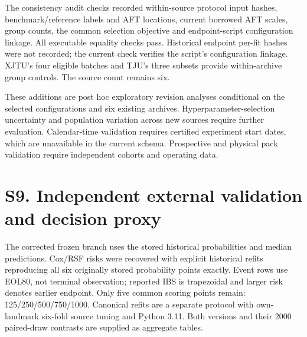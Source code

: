 \documentclass[10pt,a4paper]{article}
\begin{document}
The consistency audit checks recorded within-source protocol input hashes, benchmark/reference labels and AFT locations, current borrowed AFT scales, group counts, the common selection objective and endpoint-script configuration linkage. All executable equality checks pass. Historical endpoint per-fit hashes were not recorded; the current check verifies the script's configuration linkage. XJTU's four eligible batches and TJU's three subsets provide within-archive group controls. The source count remains six.

These additions are post hoc exploratory revision analyses conditional on the selected configurations and six existing archives. Hyperparameter-selection uncertainty and population variation across new sources require further evaluation. Calendar-time validation requires certified experiment start dates, which are unavailable in the current schema. Prospective and physical pack validation require independent cohorts and operating data.
\section*{S9. Independent external validation and decision proxy}
The corrected frozen branch uses the stored historical probabilities and median predictions. Cox/RSF risks were recovered with explicit historical refits reproducing all six originally stored probability points exactly. Event rows use EOL80, not terminal observation; reported IBS is trapezoidal and larger risk denotes earlier endpoint. Only five common scoring points remain: 125/250/500/750/1000. Canonical refits are a separate protocol with own-landmark six-fold source tuning and Python 3.11. Both versions and their 2000 paired-draw contrasts are supplied as aggregate tables.
\end{document}
